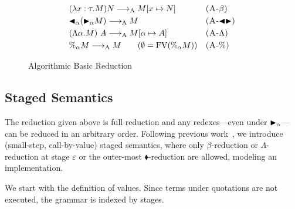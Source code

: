\begin{center}
\end{center}

\begin{figure}[tbp]
    \begin{center}
        \begin{align*}
            & (\lambda x:\tau.M) N \longrightarrow_{\text{A}} M[x \mapsto N]       &  & \textsc{(A-$\beta$)}   \\
            & {\mathop{\blacktriangleleft}}_\alpha ({\mathop{\blacktriangleright}}_\alpha M) \longrightarrow_{\text{A}} M              &  & \textsc{(A-${\mathop{\blacktriangleleft}}{\mathop{\blacktriangleright}}$)} \\
            & (\Lambda \alpha.M)\ A \longrightarrow_{\text{A}} M[\alpha \mapsto A] &  & \textsc{(A-$\Lambda$)} \\
            & \%_\alpha M \longrightarrow_{\text{A}} M \qquad (\emptyset = \text{FV}(\%_\alpha M)) &  & \textsc{(A-$\%$)}
        \end{align*}
    \end{center}
    \caption{Algorithmic Basic Reduction}
    \label{fig:algorithmic-reduction}
\end{figure}

%
%

\subsection{Staged Semantics}

The reduction given above is full reduction and any redexes---even under
${\mathop{\blacktriangleright}}_\alpha$---can be reduced in an arbitrary order.  Following previous
work~\cite{HanadaIgarashi2014CSP}, we introduce (small-step, call-by-value) staged
semantics, where only $\beta$-reduction or $\Lambda$-reduction at stage
$\varepsilon$ or the outer-most $\blacklozenge$-reduction are allowed, modeling
an implementation.

We start with the definition of values. Since terms under quotations are
not executed, the grammar is indexed by stages.

